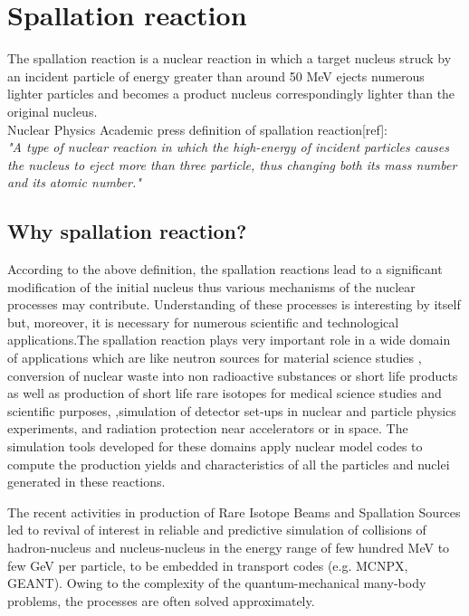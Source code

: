 \section{Spallation reaction}
	
	The spallation reaction  is a nuclear reaction in which a target nucleus struck by an incident particle of energy greater than around 50 MeV ejects numerous lighter particles and becomes a product nucleus correspondingly lighter than the original nucleus. \\
	Nuclear Physics Academic press definition of spallation reaction[ref]: \\
	\textit{ "A type of nuclear reaction in which the high-energy of incident particles causes the nucleus to eject more than three particle, thus changing both its mass number and its atomic number."}
	\subsection{Why spallation reaction?}
	According to the above definition, the spallation reactions lead to a significant modification of the initial nucleus thus various mechanisms of the nuclear processes may contribute.  Understanding of these  processes is  interesting by itself but, moreover, it is  necessary for  numerous scientific and technological applications.The spallation reaction plays very important role in a wide domain of applications which are like neutron sources for material science studies \cite{carpenter1977pulsed}, conversion of nuclear waste into non radioactive substances or short life products\cite{ravn98A} as well as production of short life rare isotopes for medical science studies \cite{bowman1992nuclear} and scientific purposes, \cite{meneguzzi1971production},simulation of detector set-ups in nuclear and particle physics experiments, and radiation protection near accelerators or in space. The simulation tools developed for these domains apply nuclear model codes to compute the production yields and characteristics of all the particles and nuclei generated in these reactions.\par
	The recent activities in production of Rare Isotope Beams and Spallation Sources led to revival of interest in reliable and predictive simulation of collisions of hadron-nucleus and nucleus-nucleus in the energy range of few hundred MeV to few GeV per particle, to be embedded in transport codes (e.g. MCNPX, GEANT). Owing to the complexity of the quantum-mechanical many-body problems, the processes are often solved approximately.

